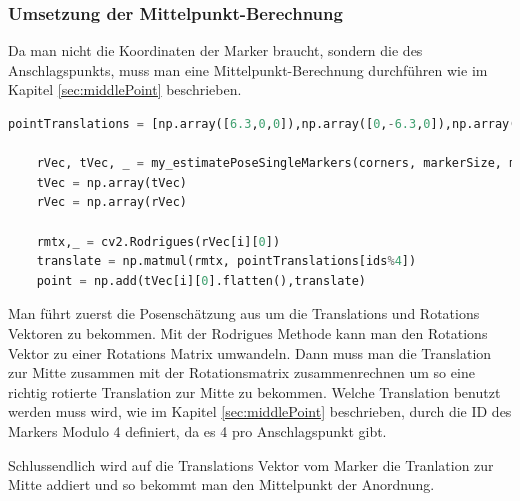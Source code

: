 \subsubsection{Umsetzung der Mittelpunkt-Berechnung}

Da man nicht die Koordinaten der Marker braucht, sondern die des Anschlagspunkts, muss man eine Mittelpunkt-Berechnung durchführen wie im Kapitel \ref{sec:middlePoint} beschrieben.

\begin{lstlisting}[language=Python, caption=ID und Ecken eines ArUco Markers erkennen]
    pointTranslations = [np.array([6.3,0,0]),np.array([0,-6.3,0]),np.array([-6.3,0,0]),np.array([0,6.3,0])]

    rVec, tVec, _ = my_estimatePoseSingleMarkers(corners, markerSize, mtx, dist)
    tVec = np.array(tVec)
    rVec = np.array(rVec)

    rmtx,_ = cv2.Rodrigues(rVec[i][0])
    translate = np.matmul(rmtx, pointTranslations[ids%4])
    point = np.add(tVec[i][0].flatten(),translate)
\end{lstlisting}

Man führt zuerst die Posenschätzung aus um die Translations und Rotations Vektoren zu bekommen.
Mit der Rodrigues Methode kann man den Rotations Vektor zu einer Rotations Matrix umwandeln.
Dann muss man die Translation zur Mitte zusammen mit der Rotationsmatrix zusammenrechnen um so eine richtig rotierte Translation zur Mitte zu bekommen.
Welche Translation benutzt werden muss wird, wie im Kapitel \ref{sec:middlePoint} beschrieben, durch die ID des Markers Modulo 4 definiert, da es 4 pro Anschlagspunkt gibt.

Schlussendlich wird auf die Translations Vektor vom Marker die Tranlation zur Mitte addiert und so bekommt man den Mittelpunkt der Anordnung.



